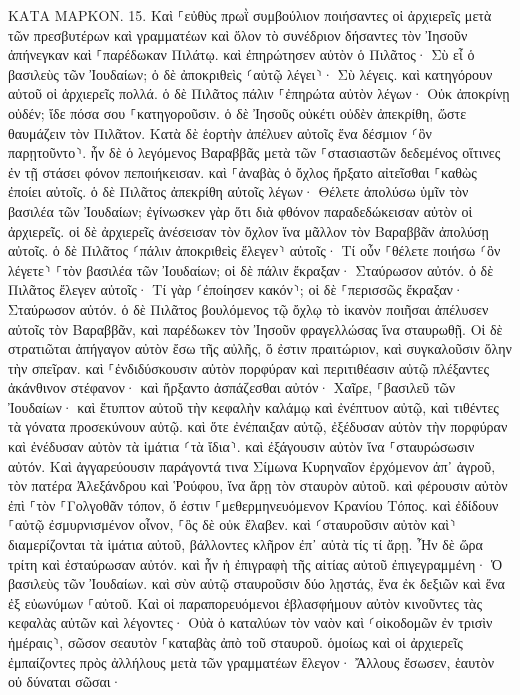\documentclass[twoside, 9pt]{extreport}
\begin{document}
ΚΑΤΑ ΜΑΡΚΟΝ.
15.
Καὶ ⸀εὐθὺς πρωῒ συμβούλιον ποιήσαντες οἱ ἀρχιερεῖς μετὰ τῶν πρεσβυτέρων καὶ γραμματέων καὶ ὅλον τὸ συνέδριον δήσαντες τὸν Ἰησοῦν ἀπήνεγκαν καὶ ⸀παρέδωκαν Πιλάτῳ. 
καὶ ἐπηρώτησεν αὐτὸν ὁ Πιλᾶτος· Σὺ εἶ ὁ βασιλεὺς τῶν Ἰουδαίων; ὁ δὲ ἀποκριθεὶς ⸂αὐτῷ λέγει⸃· Σὺ λέγεις. 
καὶ κατηγόρουν αὐτοῦ οἱ ἀρχιερεῖς πολλά. 
ὁ δὲ Πιλᾶτος πάλιν ⸀ἐπηρώτα αὐτὸν λέγων· Οὐκ ἀποκρίνῃ οὐδέν; ἴδε πόσα σου ⸀κατηγοροῦσιν. 
ὁ δὲ Ἰησοῦς οὐκέτι οὐδὲν ἀπεκρίθη, ὥστε θαυμάζειν τὸν Πιλᾶτον. 
Κατὰ δὲ ἑορτὴν ἀπέλυεν αὐτοῖς ἕνα δέσμιον ⸂ὃν παρῃτοῦντο⸃. 
ἦν δὲ ὁ λεγόμενος Βαραββᾶς μετὰ τῶν ⸀στασιαστῶν δεδεμένος οἵτινες ἐν τῇ στάσει φόνον πεποιήκεισαν. 
καὶ ⸀ἀναβὰς ὁ ὄχλος ἤρξατο αἰτεῖσθαι ⸀καθὼς ἐποίει αὐτοῖς. 
ὁ δὲ Πιλᾶτος ἀπεκρίθη αὐτοῖς λέγων· Θέλετε ἀπολύσω ὑμῖν τὸν βασιλέα τῶν Ἰουδαίων; 
ἐγίνωσκεν γὰρ ὅτι διὰ φθόνον παραδεδώκεισαν αὐτὸν οἱ ἀρχιερεῖς. 
οἱ δὲ ἀρχιερεῖς ἀνέσεισαν τὸν ὄχλον ἵνα μᾶλλον τὸν Βαραββᾶν ἀπολύσῃ αὐτοῖς. 
ὁ δὲ Πιλᾶτος ⸂πάλιν ἀποκριθεὶς ἔλεγεν⸃ αὐτοῖς· Τί οὖν ⸀θέλετε ποιήσω ⸂ὃν λέγετε⸃ ⸀τὸν βασιλέα τῶν Ἰουδαίων; 
οἱ δὲ πάλιν ἔκραξαν· Σταύρωσον αὐτόν. 
ὁ δὲ Πιλᾶτος ἔλεγεν αὐτοῖς· Τί γὰρ ⸂ἐποίησεν κακόν⸃; οἱ δὲ ⸀περισσῶς ἔκραξαν· Σταύρωσον αὐτόν. 
ὁ δὲ Πιλᾶτος βουλόμενος τῷ ὄχλῳ τὸ ἱκανὸν ποιῆσαι ἀπέλυσεν αὐτοῖς τὸν Βαραββᾶν, καὶ παρέδωκεν τὸν Ἰησοῦν φραγελλώσας ἵνα σταυρωθῇ. 
Οἱ δὲ στρατιῶται ἀπήγαγον αὐτὸν ἔσω τῆς αὐλῆς, ὅ ἐστιν πραιτώριον, καὶ συγκαλοῦσιν ὅλην τὴν σπεῖραν. 
καὶ ⸀ἐνδιδύσκουσιν αὐτὸν πορφύραν καὶ περιτιθέασιν αὐτῷ πλέξαντες ἀκάνθινον στέφανον· 
καὶ ἤρξαντο ἀσπάζεσθαι αὐτόν· Χαῖρε, ⸀βασιλεῦ τῶν Ἰουδαίων· 
καὶ ἔτυπτον αὐτοῦ τὴν κεφαλὴν καλάμῳ καὶ ἐνέπτυον αὐτῷ, καὶ τιθέντες τὰ γόνατα προσεκύνουν αὐτῷ. 
καὶ ὅτε ἐνέπαιξαν αὐτῷ, ἐξέδυσαν αὐτὸν τὴν πορφύραν καὶ ἐνέδυσαν αὐτὸν τὰ ἱμάτια ⸂τὰ ἴδια⸃. καὶ ἐξάγουσιν αὐτὸν ἵνα ⸀σταυρώσωσιν αὐτόν. 
Καὶ ἀγγαρεύουσιν παράγοντά τινα Σίμωνα Κυρηναῖον ἐρχόμενον ἀπ᾽ ἀγροῦ, τὸν πατέρα Ἀλεξάνδρου καὶ Ῥούφου, ἵνα ἄρῃ τὸν σταυρὸν αὐτοῦ. 
καὶ φέρουσιν αὐτὸν ἐπὶ ⸀τὸν ⸀Γολγοθᾶν τόπον, ὅ ἐστιν ⸀μεθερμηνευόμενον Κρανίου Τόπος. 
καὶ ἐδίδουν ⸀αὐτῷ ἐσμυρνισμένον οἶνον, ⸀ὃς δὲ οὐκ ἔλαβεν. 
καὶ ⸂σταυροῦσιν αὐτὸν καὶ⸃ διαμερίζονται τὰ ἱμάτια αὐτοῦ, βάλλοντες κλῆρον ἐπ᾽ αὐτὰ τίς τί ἄρῃ. 
Ἦν δὲ ὥρα τρίτη καὶ ἐσταύρωσαν αὐτόν. 
καὶ ἦν ἡ ἐπιγραφὴ τῆς αἰτίας αὐτοῦ ἐπιγεγραμμένη· Ὁ βασιλεὺς τῶν Ἰουδαίων. 
καὶ σὺν αὐτῷ σταυροῦσιν δύο λῃστάς, ἕνα ἐκ δεξιῶν καὶ ἕνα ἐξ εὐωνύμων ⸀αὐτοῦ. 
Καὶ οἱ παραπορευόμενοι ἐβλασφήμουν αὐτὸν κινοῦντες τὰς κεφαλὰς αὐτῶν καὶ λέγοντες· Οὐὰ ὁ καταλύων τὸν ναὸν καὶ ⸂οἰκοδομῶν ἐν τρισὶν ἡμέραις⸃, 
σῶσον σεαυτὸν ⸀καταβὰς ἀπὸ τοῦ σταυροῦ. 
ὁμοίως καὶ οἱ ἀρχιερεῖς ἐμπαίζοντες πρὸς ἀλλήλους μετὰ τῶν γραμματέων ἔλεγον· Ἄλλους ἔσωσεν, ἑαυτὸν οὐ δύναται σῶσαι· 
\end{document}
